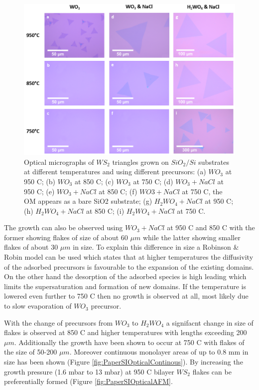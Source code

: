 \documentclass[12pt]{article}
\begin{document}
\begin{figure}[h]
\begin{center}
\includegraphics[scale=0.3]{PaperOptical.png}
\caption{Optical micrographs of $WS_2$ triangles grown on $SiO_2/Si$ substrates at different temperatures and using different precursors: (a) $WO_3$ at  950 {\degree}C; (b) $WO_3$ at 850 {\degree}C; (c) $WO_3$ at 750 {\degree}C; (d) $WO_3 + NaCl$ at 950 {\degree}C; (e) $WO_3+NaCl$ at 850 {\degree}C; (f) $WO3 + NaCl$ at 750 {\degree}C, the OM appears as a bare SiO2 substrate; (g) $H_2WO_4 + NaCl$ at 950 {\degree}C; (h) $H_2WO_4 + NaCl$ at 850 {\degree}C; (i) $H_2WO_4 + NaCl$ at 750 {\degree}C.}
\label{fig:PaperOptical}
\end{center}
\end{figure}

The growth can also be observed using $WO_3 + NaCl$ at 950 {\degree}C and 850 {\degree}C with the former showing flakes of size of about 60 $\mu m$ while the latter showing smaller flakes of about 30 $\mu m$ in size. To explain this difference in size a Robinson \& Robin model can be used which states that at higher temperatures the diffusivity of the adsorbed precursors is favourable to the expansion of the existing domains. On the other hand the desorption of the adsorbed species is high leading which limits the supersaturation and formation of new domains. If the temperature is lowered even further to 750 {\degree}C then no growth is observed at all, most likely due to slow evaporation of $WO_3$ precursor. 

With the change of precursors from $WO_3$ to $H_2WO_4$ a signifacnt change in size of flakes is observed at 850 {\degree}C  and higher temperatures with lengths exceeding 200 $\mu m$. Additionally the growth have been shown to occur at 750 {\degree}C with flakes of the size of 50-200 $\mu m$. Moreover continuous monolayer areas of up to 0.8 mm in size has been shown (Figure \ref{fig:PaperSIOpticalContinous}). By increasing the growth pressure (1.6 mbar to 13 mbar) at 950 {\degree}C bilayer $WS_2$ flakes can be preferentially formed (Figure \ref{fig:PaperSIOpticalAFM}.
\end{document}
